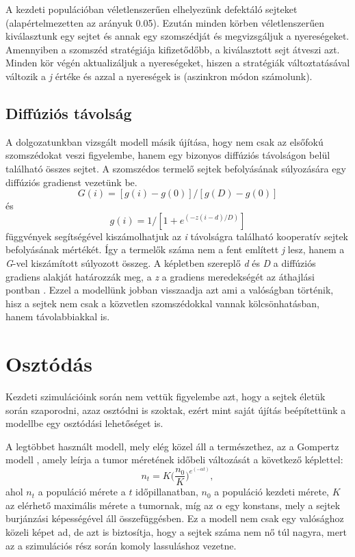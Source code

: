 A kezdeti populációban véletlenszerűen elhelyezünk defektáló sejteket (alapértelmezetten az arányuk 0.05). Ezután minden körben véletlenszerűen kiválasztunk egy sejtet és annak egy szomszédját és megvizsgáljuk a nyereségeket. Amennyiben a szomszéd stratégiája kifizetődőbb, a kiválasztott sejt átveszi azt. Minden kör végén aktualizáljuk a nyereségeket, hiszen a stratégiák változtatásával változik a \textit{j} értéke és azzal a nyereségek is (aszinkron módon számolunk). 

\subsection{Diffúziós távolság}
A dolgozatunkban vizsgált modell másik újítása, hogy nem csak az elsőfokú szomszédokat veszi figyelembe, hanem egy bizonyos diffúziós távolságon belül található összes sejtet. A szomszédos termelő sejtek befolyásának súlyozására egy diffúziós gradienst vezetünk be. 
\begin{equation}
G(i) = [g(i) - g(0)]/[g(D) - g(0)] 
\end{equation}
és
\begin{equation} \label{eq:diffGradient}
g(i) = 1/[1 + e^{(-z(i-d)/D)}]
\end{equation}
függvények segítségével kiszámolhatjuk az \textit{i} távolságra található kooperatív sejtek befolyásának mértékét. Így a termelők száma nem a fent említett \textit{j} lesz, hanem a \textit{G}-vel kiszámított súlyozott összeg. A képletben szereplő \textit{d} és \textit{D} a diffúziós gradiens alakját határozzák meg, a \textit{z} a gradiens meredekségét az áthajlási pontban \cite{archetti2016cooperation}. Ezzel a modellünk jobban visszaadja azt ami a valóságban történik, hisz a sejtek nem csak a közvetlen szomszédokkal vannak kölcsönhatásban, hanem távolabbiakkal is.

\section{Osztódás}
Kezdeti szimulációink során nem vettük figyelembe azt, hogy a sejtek életük során szaporodni, azaz osztódni is szoktak, ezért mint saját újítás beépítettünk a modellbe egy osztódási lehetőséget is. 

A legtöbbet használt modell, mely elég közel áll a természethez, az a Gompertz modell \cite{wiki:gompertz}, amely leírja a tumor méretének időbeli változását a következő képlettel:
\begin{equation}
	n_t = K \bigg(\frac{n_0}{K} \bigg) ^ {e^{(- \alpha t)}},
\end{equation}
ahol $n_t$ a populáció mérete a $t$ időpillanatban, $n_0$ a populáció kezdeti mérete, $K$ az elérhető maximális mérete a tumornak, míg az $\alpha$ egy konstans, mely a sejtek burjánzási képességével áll összefüggésben. Ez a modell nem csak egy valósághoz közeli képet ad, de azt is biztosítja, hogy a sejtek száma nem nő túl nagyra, mert az a szimulációs rész során komoly lassuláshoz vezetne. 

